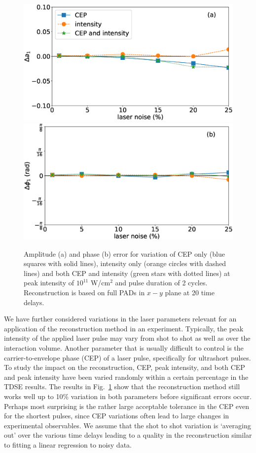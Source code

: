 \begin{figure}[!ht]
\centering
\includegraphics[width=0.49\linewidth]{figs/Photo_ionization/superpositions/Venzke_new_fig_9a.eps}
\includegraphics[width=0.49\linewidth]{figs/Photo_ionization/superpositions/Venzke_new_fig_9b.eps}
\caption{
Amplitude (a) and phase (b) error for variation of CEP only (blue squares with solid lines), intensity only (orange circles with dashed lines) and both CEP and intensity (green stars with dotted lines)
at peak intensity of  $10^{11}$ W/cm$^2$ and pulse duration of 2 cycles.  Reconstruction is based on full PADs in $x-y$ plane at 20 time delays.
} 
  \label{fig:noise}
\end{figure}

We have further considered variations in the laser parameters relevant for an application of the reconstruction method in an experiment. Typically, the peak intensity of the applied laser pulse may vary from shot to shot as well as over the interaction volume. Another parameter that is usually difficult to control is the carrier-to-envelope phase (CEP) of a laser pulse, specifically for ultrashort pulses. To study the impact on the reconstruction, CEP, peak intensity, and both CEP and peak intensity have been varied randomly within a certain percentage in the TDSE results. The results in Fig.~\ref{fig:noise} show that the reconstruction method still works well up to 10\% variation in both parameters before significant errors occur. Perhaps most surprising is the rather large acceptable tolerance in the CEP even for the shortest pulses, since CEP variations often lead to large changes in experimental observables. We assume that the shot to shot variation is `averaging out' over the various time delays leading to a quality in the reconstruction similar to fitting a linear regression to noisy data.

